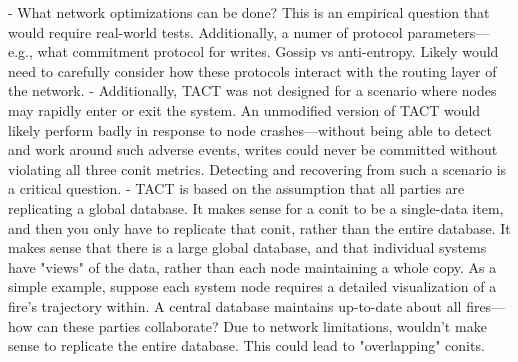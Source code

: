 - What network optimizations can be done? This is an empirical
  question that would require real-world tests. Additionally, a numer
  of protocol parameters---e.g., what commitment protocol for
  writes. Gossip vs anti-entropy. Likely would need to carefully
  consider how these protocols interact with the routing layer of the
  network.
- Additionally, TACT was not designed for a scenario where nodes may
  rapidly enter or exit the system. An unmodified version of TACT
  would likely perform badly in response to node crashes---without
  being able to detect and work around such adverse events, writes
  could never be committed without violating all three conit metrics.
  Detecting and recovering from such a scenario is a critical
  question.
- TACT is based on the assumption that all parties are replicating a
  global database. It makes sense for a conit to be a single-data
  item, and then you only have to replicate that conit, rather than
  the entire database. It makes sense that there is a large global
  database, and that individual systems have "views" of the data,
  rather than each node maintaining a whole copy. As a simple example,
  suppose each system node requires a detailed visualization of a
  fire's trajectory within. A central database maintains up-to-date
  about all fires---how can these parties collaborate? Due to network
  limitations, wouldn't make sense to replicate the entire
  database. This could lead to "overlapping" conits.
